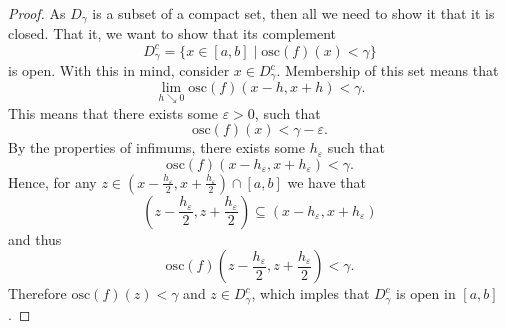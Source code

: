 \documentclass[12pt]{article}
\theoremstyle{definition}
\theoremstyle{definition}
\begin{document}
        \begin{proof}
            As $D_{\gamma}$ is a subset of a compact set, then all we need to
            show it that it is closed. That it, we want to show that its
            complement
                \begin{equation*}
                    D_{\gamma}^c=\{x\in[a, b]\mid \text{osc}(f)(x)<\gamma\} 
                \end{equation*}
            is open. With this in mind, consider $x\in D_{\gamma}^c$.
            Membership of this set means that 
                \begin{equation*}
                    \lim_{h\searrow 0}\text{osc}(f)(x-h,
                    x+h)<\gamma.
                \end{equation*}
            This means that there exists some $\varepsilon>0$, such that 
                \begin{equation*}
                    \text{osc}(f)(x)<\gamma-\varepsilon.
                \end{equation*}
            By the properties of infimums, there exists some $h_{\varepsilon}$
            such that 
                \begin{equation*}
                    \text{osc}(f)(x-h_{\varepsilon}, x+h_{\varepsilon})<\gamma.
                \end{equation*}
            Hence, for any $z\in(x-\frac{h_{\varepsilon}}{2},
            x+\frac{h_{\varepsilon}}{2})\cap[a, b]$ we have that 
                \begin{equation*}
                    (z-\frac{h_{\varepsilon}}{2},
                    z+\frac{h_{\varepsilon}}{2})\subseteq(x-h_{\varepsilon},
                    x+h_{\varepsilon})
                \end{equation*}
            and thus 
                \begin{equation*}
                    \text{osc}(f)(z-\frac{h_{\varepsilon}}{2},
                    z+\frac{h_{\varepsilon}}{2})<\gamma.
                \end{equation*}
            Therefore $\text{osc}(f)(z)<\gamma$ and $z\in D_{\gamma}^c$, which
            imples that $D_{\gamma}^c$ is open in $[a, b]$.
        \end{proof}
\end{document}
